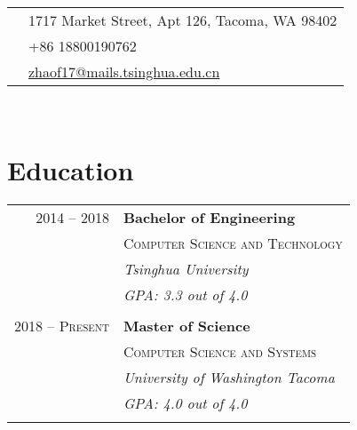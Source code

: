 \documentclass[10pt]{article} %
\begin{document}
{\begin{minipage}[t]{0.44\textwidth}

\colorbox{shade}{\textcolor{text1}{
\begin{tabular}{c|p{7cm}}
\raisebox{-4pt}{\textifsymbol{18}} & 1717 Market Street, Apt 126, Tacoma, WA 98402 \\ %
\raisebox{-3pt}{\Mobilefone} & +86 18800190762 \\ %
\raisebox{-1pt}{\Letter} & \href{mailto:zhaof17@mails.tsinghua.edu.cn}{zhaof17@mails.tsinghua.edu.cn} \\ %
\end{tabular}
}
}\\[10pt]


\section{Education}

\begin{tabular}{rl} %


2014 -- 2018 & \textbf{Bachelor of Engineering} \\
& \textsc{Computer Science and Technology} \\
& \textit{Tsinghua University}\\
& \textit{GPA: 3.3 out of 4.0}\\
&\\

2018 -- \textsc{Present} & \textbf{Master of Science} \\
& \textsc{Computer Science and Systems} \\
& \textit{University of Washington Tacoma}\\
& \textit{GPA: 4.0 out of 4.0}\\
&\\



\end{tabular}
\end{minipage}}
\end{document}

